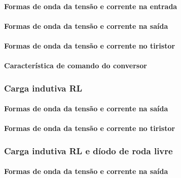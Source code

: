 \documentclass[a4paper,11pt]{article}
\numberwithin{equation}{section}
\begin{document}
\paragraph{Formas de onda da tensão e corrente na entrada}


\paragraph{Formas de onda da tensão e corrente na saída}



\paragraph{Formas de onda da tensão e corrente no tiristor}


\paragraph{Característica de comando do conversor}


\subsubsection{Carga indutiva RL}

\paragraph{Formas de onda da tensão e corrente na saída}


\paragraph{Formas de onda da tensão e corrente no tiristor}



\subsubsection{Carga indutiva RL e díodo de roda livre}

\paragraph{Formas de onda da tensão e corrente na saída}
\end{document}
